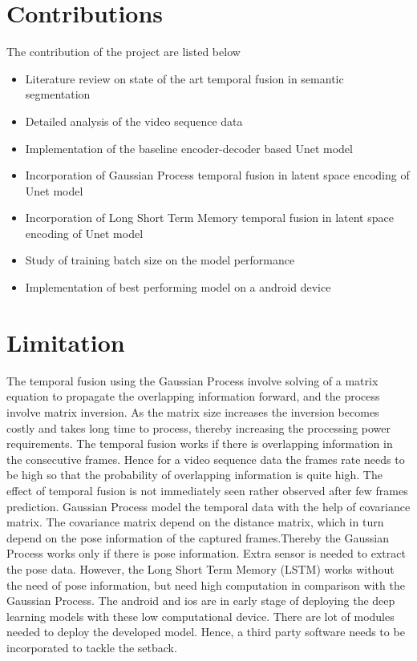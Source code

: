     \section{Contributions}
	
	The contribution of the project are listed below
	
	\begin{itemize}
		\item Literature review on state of the art temporal fusion in semantic segmentation
		\item Detailed analysis of the video sequence data
		\item Implementation of the baseline encoder-decoder based Unet model
		\item Incorporation of Gaussian Process temporal fusion in latent space encoding of Unet model
		\item Incorporation of Long Short Term Memory temporal fusion in latent space encoding of Unet model
		\item Study of training batch size on the model performance
		\item Implementation of best performing model on a android device
	\end{itemize}
	
	
    \section{Limitation}

	The temporal fusion using the Gaussian Process involve solving of a matrix equation to propagate the overlapping information forward, and the process involve matrix inversion. As the matrix size increases the inversion becomes costly and takes long time to process, thereby increasing the processing power requirements. The temporal fusion works if there is overlapping information in the consecutive frames. Hence for a video sequence data the frames rate needs to be high so that the probability of overlapping information is quite high. The effect of temporal fusion is not immediately seen rather observed after few frames prediction. Gaussian Process model the temporal data with the help of covariance matrix. The covariance matrix depend on the distance matrix, which in turn depend on the pose information of the captured frames.Thereby the Gaussian Process works only if there is pose information. Extra sensor is needed to extract the pose data. However, the Long Short Term Memory (LSTM) works without the need of pose information, but need high computation in comparison with the Gaussian Process. The android and ios are in early stage of deploying the deep learning models with these low computational device. There are lot of modules needed to deploy the developed model. Hence, a third party software needs to be incorporated to tackle the setback. 

